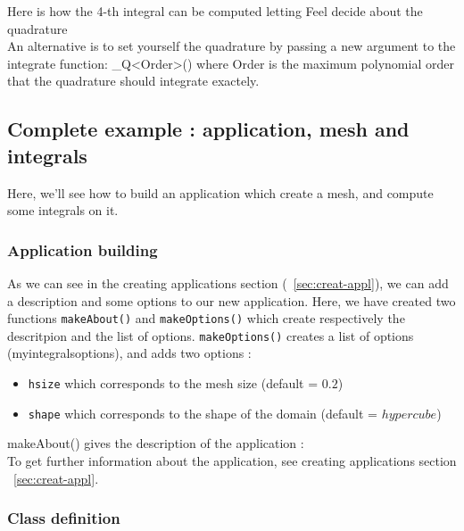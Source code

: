 Here is how the 4-th integral can be computed letting Feel decide about the quadrature \\


An alternative is to set yourself the quadrature by passing a new argument to the integrate function: \_Q<Order>() where Order is the maximum polynomial order that the quadrature should integrate exactely.


\subsection{Complete example : application, mesh and integrals}

Here, we'll see how to build an application which create a mesh, and compute some integrals on it.

\subsubsection{Application building}
As we can see in the creating applications section (~\ref{sec:creat-appl}), we can add a description and some options to our new application.
Here, we have created two functions \lstinline!makeAbout()! and \lstinline!makeOptions()! which create respectively the descritpion and the list of options.
\lstinline!makeOptions()! creates a list of options (myintegralsoptions), and adds two options :
\begin{itemize}
\item \lstinline!hsize! which corresponds to the mesh size (default = $0.2$)
\item \lstinline!shape! which corresponds to the shape of the domain (default = $hypercube$)
\end{itemize}



makeAbout() gives the description of the application :\\



To get further information about the application, see creating applications section ~\ref{sec:creat-appl}.

\subsubsection{Class definition}

